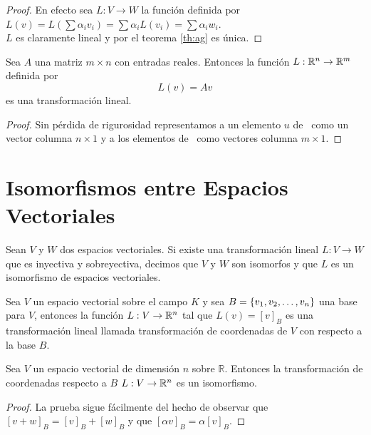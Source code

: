 \begin{proof}
En efecto sea $L: V \to W$ la función definida por $L(v) = L(\sum \alpha_i v_i) = \sum \alpha_i L(v_i) = \sum \alpha_i w_i$.
\\

$L$ es claramente lineal y por el teorema \ref{th:ag} es única.
\end{proof}

\begin{theorem}
Sea $A$ una matriz $m \times n$ con entradas reales. Entonces la función $L : \mathbb{R}^n \to \mathbb{R}^m $ definida por $$L(v)= A v$$
es una transformación lineal.
\end{theorem}

\begin{proof}
Sin pérdida de rigurosidad representamos a un elemento $u$ de \rn \ como un vector columna $n \times 1$ y a los elementos de \rmm \ como vectores columna $m \times 1$.
\end{proof}

\section{Isomorfismos entre Espacios Vectoriales}
\begin{dfn}
Sean $V$ y $W$ dos espacios vectoriales. Si existe una transformación lineal $L : V \to W$ que es inyectiva y sobreyectiva, decimos que $V$ y $W$ son isomorfos y que $L$ es un isomorfismo de espacios vectoriales.
\end{dfn}

\begin{dfn}
Sea $V$ un espacio vectorial sobre el campo $K$ y sea $B =  \lbrace v_1, v_2, \ldots, v_n \rbrace$ una base para $V$, entonces la función $L : V \to \mathbb{R}^n$ tal que $L(v) = [v]_B$ es una transformación lineal llamada transformación de coordenadas de $V$ con respecto a la base $B$.
\end{dfn}

\begin{theorem}
Sea $V$ un espacio vectorial de dimensión $n$ sobre $\mathbb{R}$. Entonces la transformación de coordenadas respecto a $B$ $L : V \to \mathbb{R}^n$ es un isomorfismo.
\end{theorem}

\begin{proof}
La prueba sigue fácilmente del hecho de observar que $[v + w]_B = [v]_B + [w]_B$ y que $[\alpha v]_B = \alpha [v]_B$.
\end{proof}

